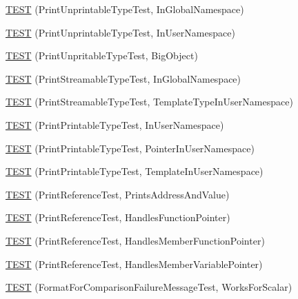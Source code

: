 \begin{DoxyCompactItemize}
\item 
\hyperlink{namespacetesting_1_1gtest__printers__test_a805264fd24de8e65cba977a798abc54c}{T\+E\+ST} (Print\+Unprintable\+Type\+Test, In\+Global\+Namespace)
\item 
\hyperlink{namespacetesting_1_1gtest__printers__test_a0aa1499e978bdde6c71e49ecc9db695b}{T\+E\+ST} (Print\+Unprintable\+Type\+Test, In\+User\+Namespace)
\item 
\hyperlink{namespacetesting_1_1gtest__printers__test_a6b6fba2a191094244f8aa78a4933a2c5}{T\+E\+ST} (Print\+Unpritable\+Type\+Test, Big\+Object)
\item 
\hyperlink{namespacetesting_1_1gtest__printers__test_a80fe9d71227a97b12fd5336a823c3d17}{T\+E\+ST} (Print\+Streamable\+Type\+Test, In\+Global\+Namespace)
\item 
\hyperlink{namespacetesting_1_1gtest__printers__test_a8ccd96504d676671a0429073d5012ff1}{T\+E\+ST} (Print\+Streamable\+Type\+Test, Template\+Type\+In\+User\+Namespace)
\item 
\hyperlink{namespacetesting_1_1gtest__printers__test_a52f5df394111bcc55aecc59ce426088d}{T\+E\+ST} (Print\+Printable\+Type\+Test, In\+User\+Namespace)
\item 
\hyperlink{namespacetesting_1_1gtest__printers__test_a3da6191eff6b016540024c2bfccdd90b}{T\+E\+ST} (Print\+Printable\+Type\+Test, Pointer\+In\+User\+Namespace)
\item 
\hyperlink{namespacetesting_1_1gtest__printers__test_aa697a3cf25b7f51f26ab49ed8ac3dd31}{T\+E\+ST} (Print\+Printable\+Type\+Test, Template\+In\+User\+Namespace)
\item 
\hyperlink{namespacetesting_1_1gtest__printers__test_aeae9b61a9fe582c72580db1466631846}{T\+E\+ST} (Print\+Reference\+Test, Prints\+Address\+And\+Value)
\item 
\hyperlink{namespacetesting_1_1gtest__printers__test_aab47074bb60b087e80675a44ad8c88ba}{T\+E\+ST} (Print\+Reference\+Test, Handles\+Function\+Pointer)
\item 
\hyperlink{namespacetesting_1_1gtest__printers__test_a88f9089e0b19be4bda74a953d6a47d7b}{T\+E\+ST} (Print\+Reference\+Test, Handles\+Member\+Function\+Pointer)
\item 
\hyperlink{namespacetesting_1_1gtest__printers__test_af9c63486049ac0ec2a1db65904702eb3}{T\+E\+ST} (Print\+Reference\+Test, Handles\+Member\+Variable\+Pointer)
\item 
\hyperlink{namespacetesting_1_1gtest__printers__test_aa7429c3701e464d0047a82686a5e8a46}{T\+E\+ST} (Format\+For\+Comparison\+Failure\+Message\+Test, Works\+For\+Scalar)

\end{DoxyCompactItemize}
